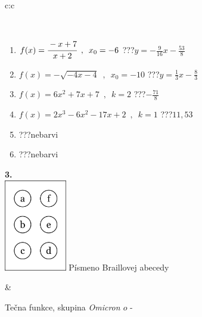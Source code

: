 \documentclass[10pt]{report}
\newcommand\omicron{o}
\begin{document}
\begin{tabular}{c:c}
\begin{minipage}[c][104.5mm][t]{0.5\linewidth}
\begin{center}
\begin{minipage}{0.95\linewidth}
\begin{center}
\end{center}
\end{minipage}
\\[1mm]
\begin{minipage}{0.79\linewidth}
\begin{center}
\begin{varwidth}{\linewidth}
\begin{enumerate}
\small
\item $f(x)=\cfrac{-x+7}{x+2}\enspace , \enspace x_0=-6$\quad \dotfill\; ???\;\dotfill \quad $y = -\frac{9}{16}x-\frac{53}{8}$
\item $f(x)=-\sqrt{-4x-4}\enspace , \enspace x_0=-10$\quad \dotfill\; ???\;\dotfill \quad $y = \frac{1}{3}x-\frac{8}{3}$
\item $f(x)=6x^2+7x+7\enspace , \enspace k=2$\quad \dotfill\; ???\;\dotfill \quad $-\frac{71}{8}$
\item $f(x)=2x^3-6x^2-17x+2\enspace , \enspace k=1$\quad \dotfill\; ???\;\dotfill \quad $11 , 53$
\item \quad \dotfill\; ???\;\dotfill \quad nebarvi
\item \quad \dotfill\; ???\;\dotfill \quad nebarvi
\end{enumerate}
\end{varwidth}
\end{center}
\end{minipage}
\begin{minipage}{0.20\linewidth}
\begin{center}
{\Huge\bfseries 3.} \\[2mm]
\includegraphics[height=40mm]{../images/braille.png}
{\small Písmeno Braillovej abecedy}
\end{center}
\end{minipage}
\end{center}
\end{minipage}
&
\begin{minipage}[c][104.5mm][t]{0.5\linewidth}
\begin{center}
\vspace{7mm}
{\huge Tečna funkce, skupina \textit{Omicron $\omicron$} -}\\[5mm]

\end{center}
\end{minipage}
\end{tabular}
\end{document}
